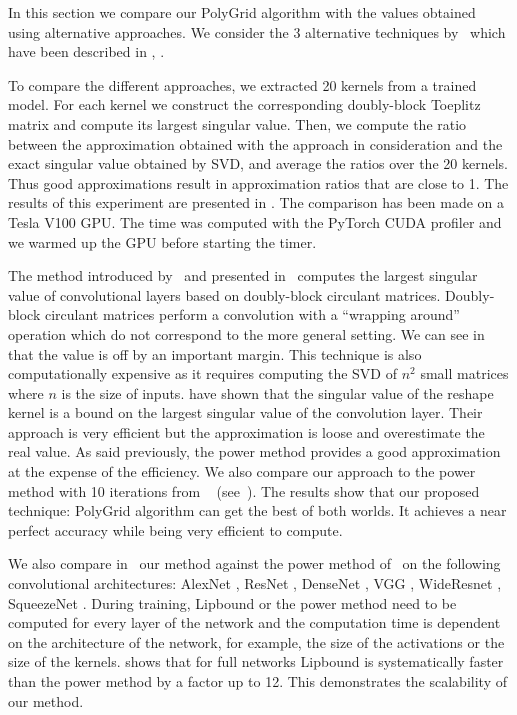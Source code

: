 In this section we compare our PolyGrid algorithm with the values obtained using alternative approaches.
We consider the 3 alternative techniques by~\citet{sedghi2018singular,singla2019bounding,farnia2018generalizable} which have been described in , .

To compare the different approaches, we extracted 20 kernels from a trained model.
For each kernel we construct the corresponding doubly-block Toeplitz matrix and compute its largest singular value.
Then, we compute the ratio between the approximation obtained with the approach in consideration and the exact singular value obtained by SVD, and average the ratios over the 20 kernels.
Thus good approximations result in approximation ratios that are close to 1.
The results of this experiment are presented in .
The comparison has been made on a Tesla V100 GPU.
The time was computed with the PyTorch CUDA profiler and we warmed up the GPU before starting the timer.

The method introduced by~\citet{sedghi2018singular} and presented in~ computes the largest singular value of convolutional layers based on doubly-block circulant matrices.
Doubly-block circulant matrices perform a convolution with a ``wrapping around'' operation which do not correspond to the more general setting.
We can see in  that the value is off by an important margin.
This technique is also computationally expensive as it requires computing the SVD of $n^2$ small matrices where $n$ is the size of inputs.
\citet{singla2019bounding} have shown that the singular value of the reshape kernel is a bound on the largest singular value of the convolution layer.
Their approach is very efficient but the approximation is loose and overestimate the real value.
As said previously, the power method provides a good approximation at the expense of the efficiency.
We also compare our approach to the power method with 10 iterations from ~\citet{farnia2018generalizable} (see~).
The results show that our proposed technique: PolyGrid algorithm can get the best of both worlds.
It achieves a near perfect accuracy while being very efficient to compute.


We also compare in~ our method against the power method of~\citet{farnia2018generalizable} on the following convolutional architectures: AlexNet \cite{krizhevsky2012imagenet}, ResNet \cite{he2016deep}, DenseNet \cite{huang2017densely}, VGG \cite{simonyan2014very}, WideResnet \cite{zagoruyko2016wide}, SqueezeNet \cite{iandola2016squeezenet}.
During training, Lipbound or the power method need to be computed for every layer of the network and the computation time is dependent on the architecture of the network, for example, the size of the activations or the size of the kernels.
 shows that for full networks Lipbound is systematically faster than the power method by a factor up to 12.
This demonstrates the scalability of our method.




